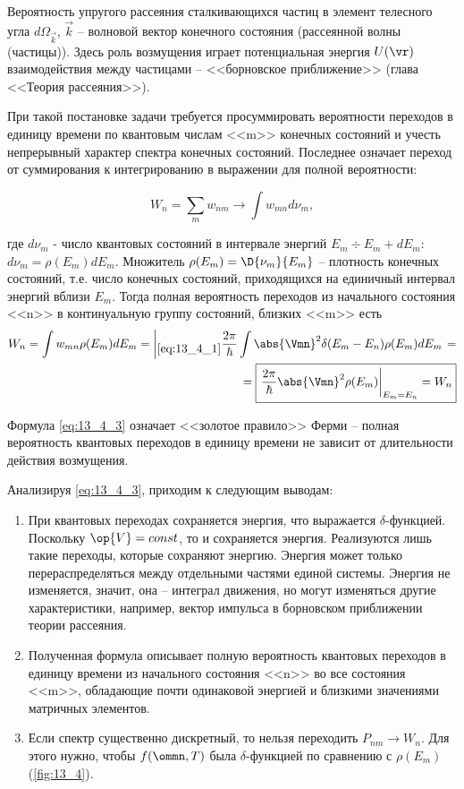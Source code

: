 \begin{exmpl}
Вероятность упругого рассеяния сталкивающихся частиц в элемент телесного угла $d\Omega_{\vec k}$, $\vec k$ -- волновой вектор конечного состояния (рассеянной волны (частицы)). Здесь роль возмущения играет потенциальная энергия $U(\vr)$ взаимодействия между частицами -- <<борновское приближение>> (глава  <<Теория рассеяния>>).
\end{exmpl}

При такой постановке задачи требуется просуммировать вероятности переходов в единицу времени по квантовым числам <<m>> конечных состояний и учесть непрерывный характер спектра конечных состояний. Последнее означает переход от суммирования к интегрированию в выражении для полной вероятности:

$$
W_n = \sum_m w_{nm} \to \int w_{mn} d \nu_m,
$$

где $d \nu_m$ - число квантовых состояний в интервале энергий $E_m \div E_m + dE_m$: \newline $\boxed{d \nu_m = \rho(E_m) dE_m}$. Множитель $\rho(E_m) = \D{\nu_m}{E_m}$ -- плотность конечных состояний, т.е. число конечных состояний, приходящихся на единичный интервал энергий вблизи $E_m$. Тогда полная вероятность переходов из начального состояния <<n>> в континуальную группу состояний, близких <<m>> есть 
\begin{eqnarray}
W_n = \int w_{mn} \rho(E_m)dE_m = \left |_{\eqref{eq:13_4_1}} \dfrac{2\pi}{\hbar} \int \abs{\Vmn}^2 \delta(E_m - E_n) \rho(E_m)dE_m \right .= \nonumber \\
\label{eq:13_4_3} = \boxed{ \left. \frac{2\pi}{\hbar} \abs{\Vmn}^2 \rho(E_m) \right|_{E_m = E_n} = W_n}
\end{eqnarray}

Формула \eqref{eq:13_4_3} означает <<золотое правило>> Ферми -- полная вероятность квантовых переходов в единицу времени не зависит от длительности действия возмущения.

Анализируя \eqref{eq:13_4_3}, приходим к следующим выводам:
\begin{enumerate}
\item При квантовых переходах сохраняется энергия, что выражается $\delta$-функцией. Поскольку $\op{V} = const$, то и сохраняется энергия. Реализуются лишь такие переходы, которые сохраняют энергию. Энергия может только перераспределяться между отдельными частями единой системы. Энергия не изменяется, значит, она -- интеграл движения, но могут изменяться другие характеристики, например, вектор импульса в борновском приближении теории рассеяния.

\item Полученная формула описывает полную вероятность квантовых переходов в единицу времени из начального состояния <<n>> во все состояния <<m>>, обладающие почти одинаковой энергией и близкими значениями матричных элементов. 

\item Если спектр существенно дискретный, то нельзя переходить $P_{nm} \to W_n$. Для этого нужно, чтобы $f(\ommn, T)$ была $\delta$-функцией по сравнению с $\rho(E_m)$ (\autoref{fig:13_4}). 
\end{enumerate}

